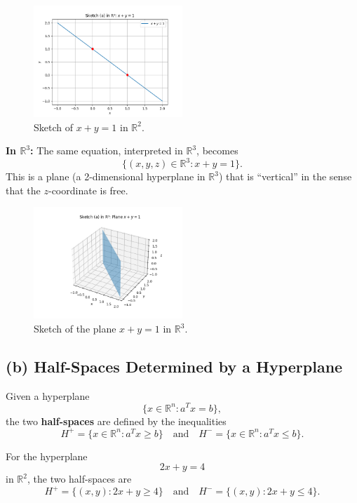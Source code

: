 \documentclass{article}
\begin{document}
\begin{figure}[H]
    \centering
    \includegraphics[width=0.5\textwidth]{a_R2.png}
    \caption{Sketch of $x+y=1$ in $\mathbb{R}^2$.}
\end{figure}

\medskip
\textbf{In $\mathbb{R}^3$:} The same equation, interpreted in $\mathbb{R}^3$, becomes
\[
\{(x,y,z) \in \mathbb{R}^3 : x+y=1\}.
\]
This is a plane (a 2-dimensional hyperplane in $\mathbb{R}^3$) that is ``vertical'' in the sense that the $z$-coordinate is free.

\begin{figure}[H]
    \centering
    \includegraphics[width=0.5\textwidth]{a_R3.png}
    \caption{Sketch of the plane $x+y=1$ in $\mathbb{R}^3$.}
\end{figure}

\subsection*{(b) Half-Spaces Determined by a Hyperplane}

Given a hyperplane
\[
\{x \in \mathbb{R}^n : a^T x = b\},
\]
the two \textbf{half-spaces} are defined by the inequalities
\[
H^+ = \{x \in \mathbb{R}^n : a^T x \ge b\} \quad \text{and} \quad H^- = \{x \in \mathbb{R}^n : a^T x \le b\}.
\]

For the hyperplane 
\[
2x + y = 4
\]
in $\mathbb{R}^2$, the two half-spaces are
\[
H^+ = \{(x,y) : 2x+y \ge 4\} \quad \text{and} \quad H^- = \{(x,y) : 2x+y \le 4\}.
\]
\end{document}
